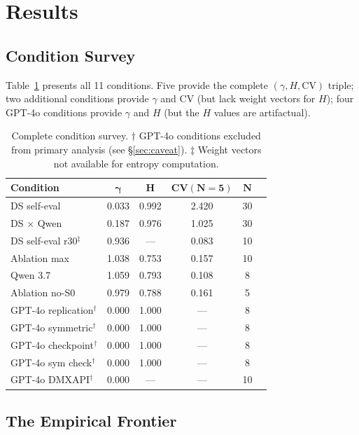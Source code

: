 \documentclass[11pt]{article}
\begin{document}
\section{Results}

\subsection{Condition Survey}

Table~\ref{tab:all} presents all 11 conditions. Five provide the complete $(\gamma, H, \text{CV})$ triple; two additional conditions provide $\gamma$ and CV (but lack weight vectors for $H$); four GPT-4o conditions provide $\gamma$ and $H$ (but the $H$ values are artifactual).

\begin{table}[t]
\centering
\caption{Complete condition survey. $\dagger$ GPT-4o conditions excluded from primary analysis (see \S\ref{sec:caveat}). $\ddagger$ Weight vectors not available for entropy computation.}
\label{tab:all}
\footnotesize
\begin{tabular}{@{}lccccc@{}}
\toprule
\textbf{Condition} & $\boldsymbol{\gamma}$ & $\boldsymbol{H}$ & $\textbf{CV}\boldsymbol{(N{=}5)}$ & $\boldsymbol{N}$ \\
\midrule
DS self-eval          & 0.033 & 0.992 & 2.420 & 30 \\
DS $\times$ Qwen      & 0.187 & 0.976 & 1.025 & 30 \\
DS self-eval r30$^\ddagger$ & 0.936 & ---   & 0.083 & 10 \\
Ablation max          & 1.038 & 0.753 & 0.157 & 10 \\
Qwen 3.7              & 1.059 & 0.793 & 0.108 & 8  \\
Ablation no-S0        & 0.979 & 0.788 & 0.161 & 5  \\
\midrule
GPT-4o replication$^\dagger$   & 0.000 & 1.000 & ---   & 8  \\
GPT-4o symmetric$^\dagger$     & 0.000 & 1.000 & ---   & 8  \\
GPT-4o checkpoint$^\dagger$    & 0.000 & 1.000 & ---   & 8  \\
GPT-4o sym check$^\dagger$     & 0.000 & 1.000 & ---   & 8  \\
GPT-4o DMXAPI$^\dagger$        & 0.000 & ---   & ---   & 10 \\
\bottomrule
\end{tabular}
\end{table}

\subsection{The Empirical Frontier}
\end{document}
